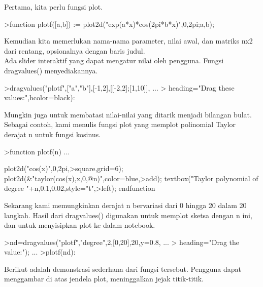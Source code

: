 \documentclass[a4paper,10pt]{article}
\begin{document}
\begin{eulernotebook}
\begin{eulercomment}
\begin{eulercomment}
\begin{eulercomment}
\begin{eulercomment}
\begin{eulercomment}
\begin{eulercomment}
\begin{eulercomment}
Pertama, kita perlu fungsi plot.
\end{eulercomment}
\begin{eulerprompt}
>function plotf([a,b]) := plot2d("exp(a*x)*cos(2pi*b*x)",0,2pi;a,b);
\end{eulerprompt}
\begin{eulercomment}
Kemudian kita memerlukan nama-nama parameter, nilai awal, dan matriks
nx2 dari rentang, opsionalnya dengan baris judul.\\
Ada slider interaktif yang dapat mengatur nilai oleh pengguna. Fungsi
dragvalues() menyediakannya.
\end{eulercomment}
\begin{eulerprompt}
>dragvalues("plotf",["a","b"],[-1,2],[[-2,2];[1,10]], ...
>  heading="Drag these values:",hcolor=black):
\end{eulerprompt}
\begin{eulercomment}
Mungkin juga untuk membatasi nilai-nilai yang ditarik menjadi bilangan
bulat. Sebagai contoh, kami menulis fungsi plot yang memplot
polinomial Taylor derajat n untuk fungsi kosinus.
\end{eulercomment}
\begin{eulerprompt}
>function plotf(n) ...
\end{eulerprompt}
\begin{eulerudf}
  plot2d("cos(x)",0,2pi,>square,grid=6);
  plot2d(&"taylor(cos(x),x,0,@n)",color=blue,>add);
  textbox("Taylor polynomial of degree "+n,0.1,0.02,style="t",>left);
  endfunction
\end{eulerudf}
\begin{eulercomment}
Sekarang kami memungkinkan derajat n bervariasi dari 0 hingga 20 dalam
20 langkah. Hasil dari dragvalues() digunakan untuk memplot sketsa
dengan n ini, dan untuk menyisipkan plot ke dalam notebook.
\end{eulercomment}
\begin{eulerprompt}
>nd=dragvalues("plotf","degree",2,[0,20],20,y=0.8, ...
>   heading="Drag the value:"); ...
>plotf(nd):
\end{eulerprompt}
\begin{eulercomment}
Berikut adalah demonstrasi sederhana dari fungsi tersebut. Pengguna
dapat menggambar di atas jendela plot, meninggalkan jejak titik-titik.
\end{eulercomment}
\begin{eulerprompt}

\end{eulerprompt}
\end{eulercomment}
\end{eulercomment}
\end{eulercomment}
\end{eulercomment}
\end{eulercomment}
\end{eulercomment}
\end{eulernotebook}
\end{document}
